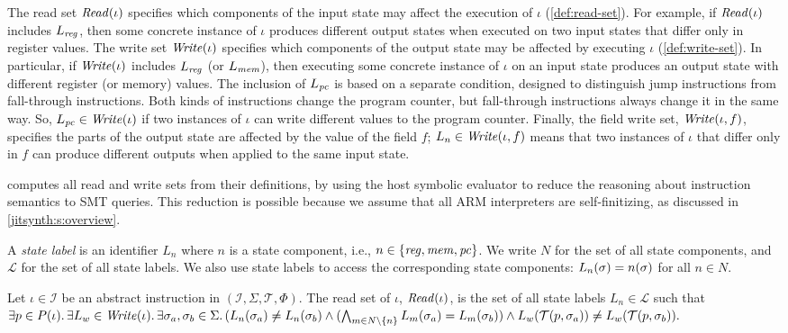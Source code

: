 The read set $\mathit{Read}(\iota)$ specifies which components of the input state may
affect the execution of $\iota$ (\autoref{def:read-set}). For example, if
$\mathit{Read}(\iota)$ includes $L_\mathit{reg}$, then some concrete instance of $\iota$
produces different output states when executed on two input states that differ
only in register values. 
%
The write set $\mathit{Write}(\iota)$ specifies which components of the output state may
be affected by executing $\iota$ (\autoref{def:write-set}). In particular, if
$\mathit{Write}(\iota)$ includes $L_\mathit{reg}$ (or $L_\mathit{mem}$), then executing some concrete
instance of $\iota$ on an input state produces an output state with different
register (or memory) values. The inclusion of $L_\mathit{pc}$ is based on a separate
condition, designed to distinguish jump instructions from fall-through
instructions. Both kinds of instructions change the program counter, but
fall-through instructions always change it in the same way. So,
$L_\mathit{pc}\in\mathit{Write}(\iota)$ if two instances of $\iota$ can write different values
to the program counter.
%
Finally, the field write set, $\mathit{Write}(\iota, f)$, specifies the parts of the
output state are affected by the value of the field $f$; $L_n \in
\mathit{Write}(\iota, f)$ means that two instances of $\iota$ that differ only in $f$
can produce different outputs when applied to the same input state.\tighten

\jitsynth computes all read and write sets from their definitions, by using the
host symbolic evaluator to reduce the reasoning about instruction semantics to
SMT queries. This reduction is possible because we assume that all ARM
interpreters are self-finitizing, as discussed in \autoref{jitsynth:s:overview}.

\begin{definition}\label{def:state-labels} 
  A \emph{state label} is an identifier $L_n$ where $n$ is a state component,
  i.e., $n\in \{\mathit{reg},\mathit{mem},\mathit{pc}\}$. We write $N$ for the set of all state
  components, and $\mathcal{L}$ for the set of all state labels. We also use
  state labels to access the corresponding state components:
  $L_n(\sigma) = n(\sigma)$ for all $n\in N$.
\end{definition}

\begin{definition}\label{def:read-set}
  Let $\iota\in\mathcal{I}$ be an abstract instruction in $(\mathcal{I},
  \Sigma, \mathcal{T}, \Phi)$. The \textup{read set} of $\iota$,
  $\mathit{Read}(\iota)$, is the set of all state labels $L_n\in\mathcal{L}$ such that 
  $
    \exists p\in P(\iota).\, 
    \exists L_w \in\mathit{Write}(\iota).\,
    \exists \sigma_a, \sigma_b \in\Sigma.\,
    (L_n(\sigma_a) \neq L_n(\sigma_b) \wedge 
    (\bigwedge_{m\in N \setminus \{ n \}} L_m(\sigma_a) = L_m(\sigma_b)) \wedge
    L_w(\mathcal{T}(p,\sigma_a)) \neq L_w(\mathcal{T}(p,\sigma_b)).
  $\tighten
\end{definition}

